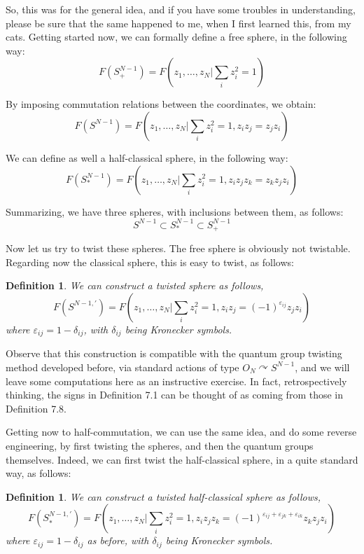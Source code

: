 \documentclass[12pt]{amsbook}
\newtheorem{definition}[theorem]{Definition}
\begin{document}
So, this was for the general idea, and if you have some troubles in understanding, please be sure that the same happened to me, when I first learned this, from my cats. Getting started now, we can formally define a free sphere, in the following way:
$$F(S^{N-1}_+)=F\left(z_1,\ldots,z_N\Big|\sum_iz_i^2=1\right)$$

By imposing commutation relations between the coordinates, we obtain:
$$F(S^{N-1})=F\left(z_1,\ldots,z_N\Big|\sum_iz_i^2=1,z_iz_j=z_jz_i\right)$$

We can define as well a half-classical sphere, in the following way:
$$F(S^{N-1}_*)=F\left(z_1,\ldots,z_N\Big|\sum_iz_i^2=1,z_iz_jz_k=z_kz_jz_i\right)$$

Summarizing, we have three spheres, with inclusions between them, as follows:
$$S^{N-1}\subset S^{N-1}_*\subset S^{N-1}_+$$

Now let us try to twist these spheres. The free sphere is obviously not twistable. Regarding now the classical sphere, this is easy to twist, as follows:

\begin{definition}
We can construct a twisted sphere as follows,
$$F(S^{N-1,\prime})=F\left(z_1,\ldots,z_N\Big|\sum_iz_i^2=1,z_iz_j=(-1)^{\varepsilon_{ij}}z_jz_i\right)$$
where $\varepsilon_{ij}=1-\delta_{ij}$, with $\delta_{ij}$ being Kronecker symbols.
\end{definition}

Observe that this construction is compatible with the quantum group twisting method developed before, via standard actions of type $O_N\curvearrowright S^{N-1}$, and we will leave some computations here as an instructive exercise. In fact, retrospectively thinking, the signs in Definition 7.1 can be thought of as coming from those in Definition 7.8.

\bigskip

Getting now to half-commutation, we can use the same idea, and do some reverse engineering, by first twisting the spheres, and then the quantum groups themselves. Indeed, we can first twist the half-classical sphere, in a quite standard way, as follows:

\begin{definition}
We can construct a twisted half-classical sphere as follows,
$$F(S^{N-1,\prime}_*)=F\left(z_1,\ldots,z_N\Big|\sum_iz_i^2=1,z_iz_jz_k=(-1)^{\varepsilon_{ij}+\varepsilon_{jk}+\varepsilon_{ik}}z_kz_jz_i\right)$$
where $\varepsilon_{ij}=1-\delta_{ij}$ as before, with $\delta_{ij}$ being Kronecker symbols.
\end{definition}
\end{document}
